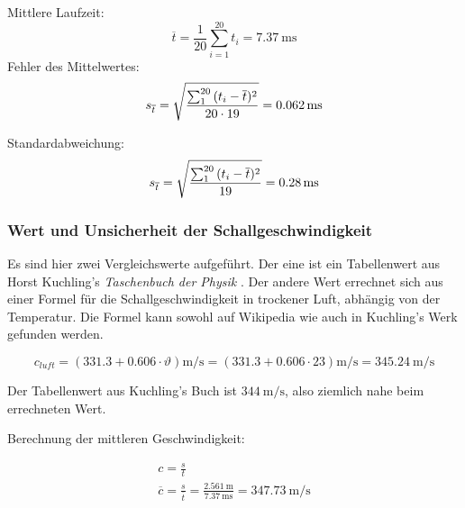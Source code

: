 Mittlere Laufzeit:
\begin{equation}
    \overline{t} = \frac{1}{20} \sum_{i=1}^{20} t_i = \SI{7.37}{\milli\second}
\end{equation}
Fehler des Mittelwertes:
\begin{equation}
    s_{\overline{t}} = \sqrt{ \frac{\sum_{1}^{20}{(t_i-\overline{t})^2}}{20 \cdot 19}} = \SI{0.062}{\milli\second} \\
\end{equation}

Standardabweichung:
\begin{equation}
    s_{\overline{t}} = \sqrt{ \frac{\sum_{1}^{20}{(t_i-\overline{t})^2}}{19}} = \SI{0.28}{\milli\second} \\
\end{equation}


\subsubsection{Wert und Unsicherheit der Schallgeschwindigkeit}

Es   sind   hier  zwei   Vergleichswerte   aufgef\"uhrt. Der   eine  ist   ein
Tabellenwert    aus   Horst    Kuchling's   \emph{Taschenbuch    der   Physik}
\cite{ref:kuchling:speedOfSoundTable}.    Der  andere   Wert  errechnet   sich
aus   einer    Formel   f\"ur    die   Schallgeschwindigkeit    in   trockener
Luft,   abh\"angig   von  der   Temperatur.  Die   Formel   kann  sowohl   auf
Wikipedia  \cite{ref:wikipedia:speedOfSound}  wie   auch  in  Kuchling's  Werk
\cite{ref:kuchling:speedOfSoundFormula} gefunden werden.

\begin{equation}
    \label{eq:schallgeschwTemperatur}
    c_{luft} = (331.3 + 0.606 \cdot \vartheta) \si{\meter\per\second} = (331.3 + 0.606 \cdot 23) \si{\meter\per\second} = \SI{345.24}{\meter\per\second}
\end{equation}

Der Tabellenwert  aus Kuchling's Buch ist  $\SI{344}{\meter\per\second}$, also
ziemlich nahe beim errechneten Wert.


Berechnung der mittleren Geschwindigkeit:

\begin{gather}
    c = \frac{s}{t} \\
    \overline{c} = \frac{s}{\overline{t}} = \frac{\SI{2.561}{\meter}}{\SI{7.37}{\milli\second}} = \SI{347.73}{\meter\per\second} \\
\end{gather}

